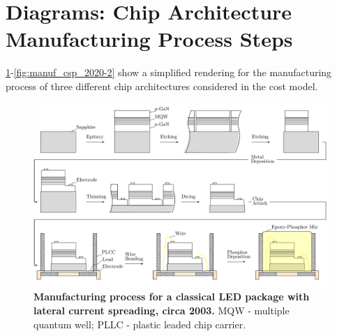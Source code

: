 \documentclass[parskip=full]{article}
\begin{document}
\section{Diagrams: Chip Architecture Manufacturing Process Steps}
\label{sec:manufacturing_steps}

\cref{fig:manuf_classical_2003}-\cref{fig:manuf_csp_2020-2} show a simplified rendering for the manufacturing process of three different chip architectures considered in the cost model.

\vspace{-20mm}


    \begin{landscape}
        \begin{figure}
            \includegraphics[width=555pt]{./figures/classical_overview_2003.pdf}
            \caption{\textbf{Manufacturing process for a classical LED package with lateral current spreading, circa 2003.} MQW - multiple quantum well; PLLC - plastic leaded chip carrier.}
        \label{fig:manuf_classical_2003}
        \end{figure}
    \end{landscape}
    
\end{document}

